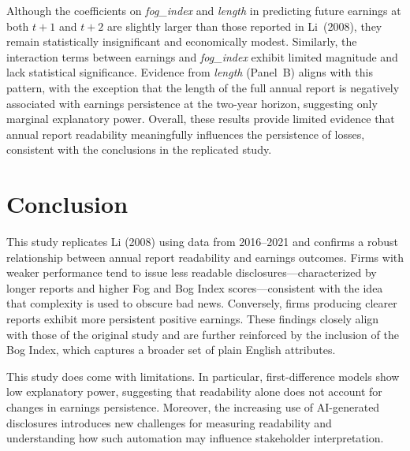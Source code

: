 \documentclass[a4paper]{article}
\begin{document}
Although the coefficients on \textit{fog\_index} and \textit{length} in predicting future earnings at both $t{+}1$ and $t{+}2$ are slightly larger than those reported in Li~(2008), they remain statistically insignificant and economically modest. Similarly, the interaction terms between earnings and \textit{fog\_index} exhibit limited magnitude and lack statistical significance. Evidence from \textit{length} (Panel~B) aligns with this pattern, with the exception that the length of the full annual report is negatively associated with earnings persistence at the two-year horizon, suggesting only marginal explanatory power. Overall, these results provide limited evidence that annual report readability meaningfully influences the persistence of losses, consistent with the conclusions in the replicated study.

\section{Conclusion}

This study replicates Li (2008) using data from 2016–2021 and confirms a robust relationship between annual report readability and earnings outcomes. Firms with weaker performance tend to issue less readable disclosures—characterized by longer reports and higher Fog and Bog Index scores—consistent with the idea that complexity is used to obscure bad news. Conversely, firms producing clearer reports exhibit more persistent positive earnings. These findings closely align with those of the original study and are further reinforced by the inclusion of the Bog Index, which captures a broader set of plain English attributes.

This study does come with limitations. In particular, first-difference models show low explanatory power, suggesting that readability alone does not account for changes in earnings persistence. Moreover, the increasing use of AI-generated disclosures introduces new challenges for measuring readability and understanding how such automation may influence stakeholder interpretation.

 


\end{document}
